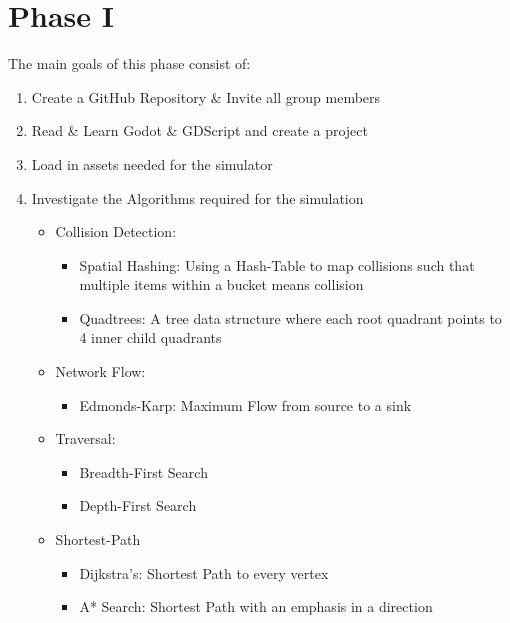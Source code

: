 \documentclass[12pt]{article}
\begin{document}
\section*{Phase I}
The main goals of this phase consist of:
\begin{enumerate}
\item Create a GitHub Repository \& Invite all group members
\item Read \& Learn Godot \& GDScript and create a project
\item Load in assets needed for the simulator
\item Investigate the Algorithms required for the simulation
	\begin{itemize}
	\item Collision Detection: 
		\begin{itemize}
		\item Spatial Hashing: Using a Hash-Table to map collisions 
		such that multiple items within a bucket means collision
		\item Quadtrees: A tree data structure where each root quadrant 			points to 4 inner child quadrants
		\end{itemize}
	\item Network Flow:
		\begin{itemize}
		\item Edmonds-Karp: Maximum Flow from source to a sink
		\end{itemize}
	\item Traversal:
		\begin{itemize}
		\item Breadth-First Search
		\item Depth-First Search
		\end{itemize}
	\item Shortest-Path
		\begin{itemize}
		\item Dijkstra's: Shortest Path to every vertex
		\item A* Search: Shortest Path with an emphasis in a direction
		\end{itemize}
	\end{itemize}
\end{enumerate}
\end{document}
